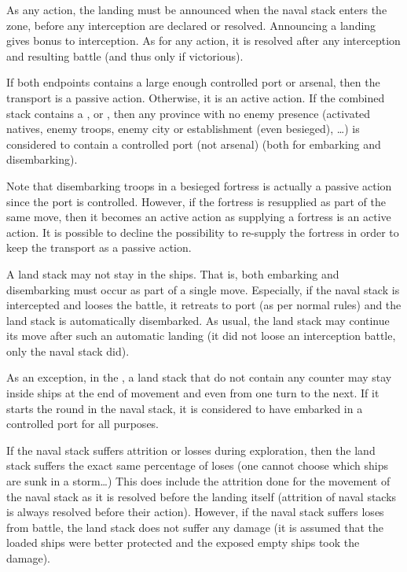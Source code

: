 As any action, the landing must be announced when the naval stack enters the
zone, before any interception are declared or resolved. Announcing a landing
gives bonus to interception. As for any action, it is resolved after any
interception and resulting battle (and thus only if victorious).

If both endpoints contains a large enough controlled port or arsenal, then the
transport is a passive action. Otherwise, it is an active action. If the
combined stack contains a \LeaderE, \LeaderC or \LeaderGov, then any province
with no enemy presence (activated natives, enemy troops, enemy city or
establishment (even besieged), \ldots) is considered to contain a controlled
port (not arsenal) (both for embarking and disembarking).

Note that disembarking troops in a besieged fortress is actually a passive
action since the port is controlled. However, if the fortress is resupplied as
part of the same move, then it becomes an active action as supplying a
fortress is an active action. It is possible to decline the possibility to
re-supply the fortress in order to keep the transport as a passive action.

A land stack may not stay in the ships. That is, both embarking and
disembarking must occur as part of a single move. Especially, if the naval
stack is intercepted and looses the battle, it retreats to port (as per normal
rules) and the land stack is automatically disembarked. As usual, the land
stack may continue its move after such an automatic landing (it did not loose
an interception battle, only the naval stack did).

As an exception, in the \ROTW, a land stack that do not contain any \ARMY
counter may stay inside ships at the end of movement and even from one turn to
the next. If it starts the round in the naval stack, it is considered to have
embarked in a controlled port for all purposes.

If the naval stack suffers attrition or losses during exploration, then the
land stack suffers the exact same percentage of loses (one cannot choose which
ships are sunk in a storm\ldots) This does include the attrition done for the
movement of the naval stack as it is resolved before the landing itself
(attrition of naval stacks is always resolved before their action). However,
if the naval stack suffers loses from battle, the land stack does not suffer
any damage (it is assumed that the loaded ships were better protected and the
exposed empty ships took the damage).

